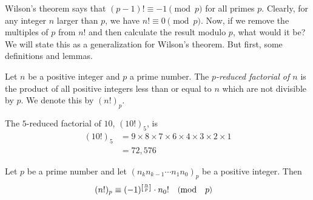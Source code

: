 \documentclass{subfile}
\begin{document}
Wilson's theorem says that $(p-1)! \equiv -1 \pmod p$ for all primes $p$. Clearly, for any integer $n$ larger than $p$, we have $n! \equiv 0 \pmod p$. Now, if we remove the multiples of $p$ from $n!$ and then calculate the result modulo $p$, what would it be? We will state this as a generalization for Wilson's theorem. But first, some definitions and lemmas.

	\begin{definition}
		Let $n$ be a positive integer and $p$ a prime number. The \textit{$p$-reduced factorial of $n$} is the product of all positive integers less than or equal to $n$ which are not divisible by $p$. We denote this by $(n!)_p$.
	\end{definition}

	\begin{example}
		The $5$-reduced factorial of $10$, $(10!)_5$, is
			\begin{align*}
				(10!)_5
					& = 9 \times 8 \times 7 \times 6 \times 4 \times 3 \times 2 \times 1\\
					& = 72,576
			\end{align*}
	\end{example}


	\begin{theorem}\label{thm:reducedfactorialmodp}
		Let $p$ be a prime number and let $(n_k n_{k-1}\cdots n_1 n_0)_p$ be a positive integer. Then
			\begin{align*}
				(n!)_p
					& \equiv (-1)^{\floor{\frac{n}{p}}} \cdot n_0!\pmod p
			\end{align*}
	\end{theorem}
\end{document}
